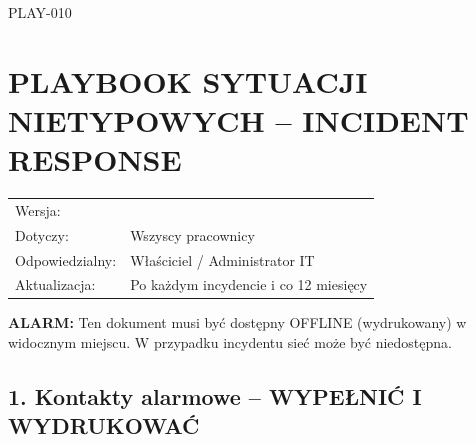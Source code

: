 \documentclass[12pt,a4paper]{article}
\begin{document}
\label{doc10}
PLAY-010

\section{PLAYBOOK SYTUACJI NIETYPOWYCH -- INCIDENT
RESPONSE}\label{playbook-sytuacji-nietypowych-incident-response}

\begin{longtable}[]{@{}>{\raggedright\arraybackslash}p{}>{\raggedright\arraybackslash}p{}@{}}
\toprule\noalign{}
\endhead
\bottomrule\noalign{}
\endlastfoot
Wersja: & 1.0 \\
Dotyczy: & Wszyscy pracownicy \\
Odpowiedzialny: & Właściciel / Administrator IT \\
Aktualizacja: & Po każdym incydencie i co 12 miesięcy \\
\end{longtable}

\textbf{ALARM:} Ten dokument musi być dostępny OFFLINE (wydrukowany) w widocznym
miejscu. W przypadku incydentu sieć może być niedostępna.

\subsection{1. Kontakty alarmowe -- WYPEŁNIĆ I
WYDRUKOWAĆ}\label{kontakty-alarmowe-wypeux142niux107-i-wydrukowaux107}
\end{document}
